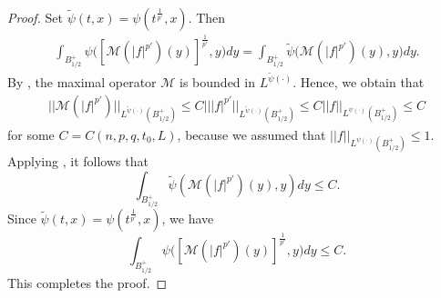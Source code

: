 \documentclass[11pt, reqno]{amsart}
\numberwithin{equation}{section}
\begin{document}
\begin{proof}
Set $\tilde{\psi}(t,x) = \psi(t^{\frac{1}{p'}},x)$.
Then
\begin{align*}
\int_{B_{1/2}^{+}} \psi \big( [\mathcal{M}(|f|^{p'})(y)]^{\frac{1}{p'}} , y \big) dy=
\int_{B_{1/2}^{+}} \tilde{\psi} \big(  \mathcal{M}(|f|^{p'})(y), y \big) dy.
\end{align*}
By \cite[Theorem 4.3.4]{MR3931352}, the maximal operator $\mathcal{M}$ is bounded in $L^{\tilde{\psi}(\cdot)}$.
Hence, we obtain that
\begin{align*}
||\mathcal{M}(|f|^{p'})||_{L^{\tilde{\psi}(\cdot)}(B_{1/2}^{+})}
\le C |||f|^{p'}||_{L^{\tilde{\psi}(\cdot)}(B_{1/2}^{+})}
\le C ||f||_{L^{\psi(\cdot)}(B_{1/2}^{+})} \le C
\end{align*}
for some $C=C(n,p,q, t_{0}, L)$,
because we assumed that $||f||_{L^{\psi(\cdot)}(B_{1/2}^{+})} \le1$.
Applying \cite[Lemma 3.2.3]{MR3931352}, it follows that
$$ \int_{B_{1/2}^{+}} \tilde{\psi} (\mathcal{M}(|f|^{p'})(y),y) dy \le C.$$
Since $\tilde{\psi}(t,x) = \psi(t^{\frac{1}{p'}},x)$, we have
$$ \int_{B_{1/2}^{+}} \psi \big([\mathcal{M}(|f|^{p'})(y)]^{\frac{1}{p'}},y\big) dy \le C.$$
This completes the proof.
\end{proof}
\end{document}
